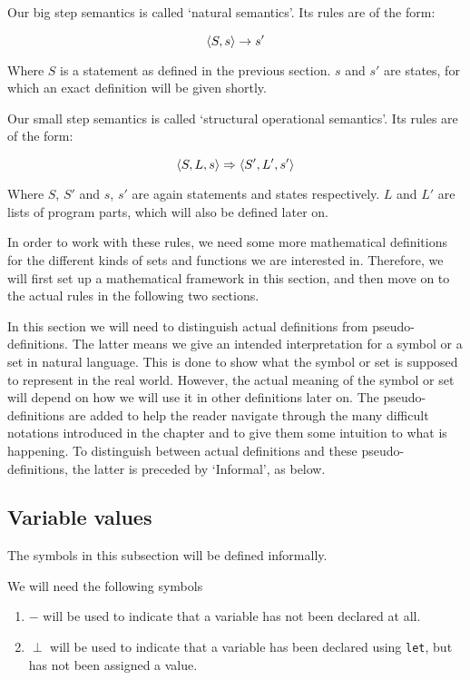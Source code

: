 Our big step semantics is called `natural semantics'. Its rules are of the form: 

$$\langle S, s \rangle \to s'$$

Where $S$ is a statement as defined in the previous section. $s$ and $s'$ are states, for which an exact definition will be given shortly. 

Our small step semantics is called `structural operational semantics'. Its rules are of the form:

$$\langle S, L, s \rangle \Rightarrow \langle S', L', s' \rangle$$

Where $S$, $S'$ and $s$, $s'$ are again statements and states respectively. $L$ and $L'$ are lists of program parts, which will also be defined later on. 

In order to work with these rules, we need some more mathematical definitions for the different kinds of sets and functions we are interested in. Therefore, we will first set up a mathematical framework in this section, and then move on to the actual rules in the following two sections. 

In this section we will need to distinguish actual definitions from pseudo-definitions. The latter means we give an intended interpretation for a symbol or a set in natural language. This is done to show what the symbol or set is supposed to represent in the real world. However, the actual meaning of the symbol or set will depend on how we will use it in other definitions later on. The pseudo-definitions are added to help the reader navigate through the many difficult notations introduced in the chapter and to give them some intuition to what is happening. To distinguish between actual definitions and these pseudo-definitions, the latter is preceded by `Informal', as below. 

\subsection*{Variable values}
The symbols in this subsection will be defined informally.  

\begin{infdefinition}
We will need the following symbols 
\begin{enumerate}[noitemsep, label={\roman*)}]
    \item $-$ will be used to indicate that a variable has not been declared at all.
    \item $\perp$ will be used to indicate that a variable has been declared using \verb|let|, but has not been assigned a value.
\end{enumerate}
\end{infdefinition}

